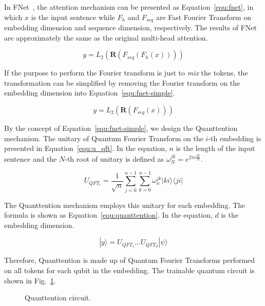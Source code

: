In FNet~\cite{}, the attention mechanism can be presented as Equation~\ref{equ:fnet}, in which $x$ is the input sentence while $F_h$ and $F_{seq}$ are Fast Fourier Transform on embedding dimension and sequence dimension, respectively. The results of FNet are approximately the same as the original multi-head attention.

\begin{equation} \label{equ:fnet}
y =  L_2(\mathbf{R}(F_{seq}(F_h(x))))
\end{equation}

If the purpose to perform the Fourier transform is just to \emph{mix} the tokens, the transformation can be simplified by removing the Fourier transform on the embedding dimension into Equation~\ref{equ:fnet-simple}.

\begin{equation} \label{equ:fnet-simple}
y = L_2(\mathbf{R}(F_{seq}(x)))
\end{equation}

By the concept of Equation~\ref{equ:fnet-simple}, we design the Quanttention mechanism. The unitary of Quantum Fourier Transform on the $i$-th embedding is presented in Equation~\ref{equ:u_qft}. In the equation, $n$ is the length of the input sentence and the $N$-th root of unitary is defined as $\omega^{jk}_N = e^{2\pi i \frac{jk}{N}}$.

\begin{equation} \label{equ:u_qft}
U_{QFT_i} = \frac{1}{\sqrt{n}} \sum_{j=0}^{n-1}  \sum_{k=0}^{n-1} \omega _{n}^{jk} |ki\rangle \langle ji|
\end{equation}

The Quanttention mechanism employs this unitary for each embedding. The formula is shown as Equation~\ref{equ:quanttention}. In the equation, $d$ is the embedding dimension.
 
\begin{equation} \label{equ:quanttention}
|y\rangle = U_{QFT_1}\ldots U_{QFT_d}|\psi\rangle
\end{equation}

Therefore, Quanttention is made up of Quantum Fourier Transforms performed on all tokens for each qubit in the embedding. The trainable quantum circuit is shown in Fig.~\ref{fig:quanttention}.

\begin{figure}[htp]
  \centering
  \caption{Quanttention circuit.}
  \label{fig:quanttention}
\end{figure}


